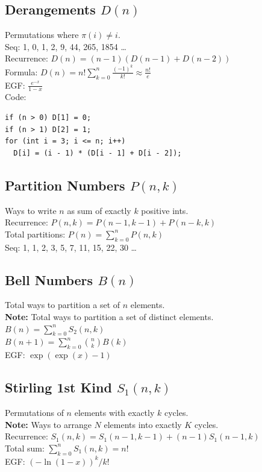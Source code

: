 \subsection{Derangements $D(n)$}
Permutations where $\pi(i) \neq i$. \\
Seq: 1, 0, 1, 2, 9, 44, 265, 1854 \dots \\
\textbullet{} Recurrence: $D(n) = (n-1)(D(n-1) + D(n-2))$ \\
\textbullet{} Formula: $D(n) = n! \sum_{k=0}^n \frac{(-1)^k}{k!} \approx \frac{n!}{e}$ \\
\textbullet{} EGF: $\frac{e^{-x}}{1-x}$ \\
\textbullet{} Code:
\begin{verbatim}
if (n > 0) D[1] = 0;
if (n > 1) D[2] = 1;
for (int i = 3; i <= n; i++)
  D[i] = (i - 1) * (D[i - 1] + D[i - 2]);
\end{verbatim}
\subsection{Partition Numbers $P(n,k)$}
Ways to write $n$ as sum of exactly $k$ positive ints. \\
\textbullet{} Recurrence: $P(n,k) = P(n-1,k-1) + P(n-k,k)$ \\
\textbullet{} Total partitions: $P(n) = \sum_{k=0}^n P(n,k)$ \\
Seq: 1, 1, 2, 3, 5, 7, 11, 15, 22, 30 \dots

\subsection{Bell Numbers $B(n)$}
Total ways to partition a set of $n$ elements. \\
\textbf{Note:} Total ways to partition a set of distinct elements. \\
\textbullet{} $B(n) = \sum_{k=0}^n S_2(n,k)$ \\
\textbullet{} $B(n+1) = \sum_{k=0}^n \binom{n}{k} B(k)$ \\
\textbullet{} EGF: $\exp(\exp(x)-1)$

\subsection{Stirling 1st Kind $S_1(n,k)$}
Permutations of $n$ elements with exactly $k$ cycles. \\
\textbf{Note:} Ways to arrange $N$ elements into exactly $K$ cycles. \\
\textbullet{} Recurrence: $S_1(n,k) = S_1(n-1,k-1) + (n-1)S_1(n-1,k)$ \\
\textbullet{} Total sum: $\sum_{k=0}^n S_1(n,k) = n!$ \\
\textbullet{} EGF: $(-\ln(1-x))^k / k!$

